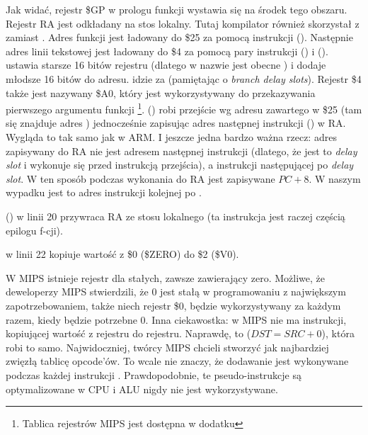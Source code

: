 

Jak widać, rejestr \$GP w prologu funkcji wystawia się na środek tego obszaru.
Rejestr \ac{RA} jest odkładany na stos lokalny.
Tutaj kompilator również skorzystał z \puts zamiast \printf.
Adres funkcji \puts jest ładowany do \$25 za pomocą instrukcji  ().
Następnie adres linii tekstowej jest ładowany do \$4 za pomocą pary instrukcji  () i
 ().
 ustawia starsze 16 bitów rejestru (dlatego w nazwie jest obecne ) i 
dodaje młodsze 16 bitów do adresu.
 idzie za  (pamiętając o \emph{branch delay slots}).
Rejestr \$4 także jest nazywany \$A0, który jest wykorzystywany do przekazywania pierwszego argumentu funkcji
\footnote{Tablica rejestrów MIPS jest dostępna w dodatku }.
 () robi przejście wg adresu zawartego w \$25 (tam się znajduje adres \puts) 
jednocześnie zapisując adres następnej instrukcji () w \ac{RA}.
Wygląda to tak samo jak w ARM.
I jeszcze jedna bardzo ważna rzecz: adres zapisywany do \ac{RA} nie jest adresem następnej instrukcji (dlatego, że jest to
\emph{delay slot} i wykonuje się przed instrukcją przejścia),
a instrukcji następującej po \emph{delay slot}.
W ten sposób podczas wykonania  do \ac{RA} jest zapisywane $PC + 8$.
W naszym wypadku jest to adres instrukcji  kolejnej po .

 () w linii 20 przywraca \ac{RA} ze stosu lokalnego (ta instrukcja jest raczej częścią epilogu f-cji).

 w linii 22 kopiuje wartość z \$0 (\$ZERO) do \$2 (\$V0).

\label{MIPS_zero_register}
W MIPS istnieje rejestr dla stałych, zawsze zawierający zero.
Możliwe, że deweloperzy MIPS stwierdzili, że 0 jest stałą w programowaniu z największym zapotrzebowaniem,
także niech rejestr \$0, będzie wykorzystywany za każdym razem, kiedy będzie potrzebne 0.
Inna ciekawostka: w MIPS nie ma instrukcji, kopiującej wartość z rejestru do rejestru.
Naprawdę,  to  ($DST=SRC+0$), która robi to samo.
Najwidoczniej, twórcy MIPS chcieli stworzyć jak najbardziej zwięzłą tablicę opcode'ów.
To wcale nie znaczy, że dodawanie jest wykonywane podczas każdej instrukcji .
Prawdopodobnie, te pseudo-instrukcje są optymalizowane w \ac{CPU} i \ac{ALU} nigdy nie jest wykorzystywane.

